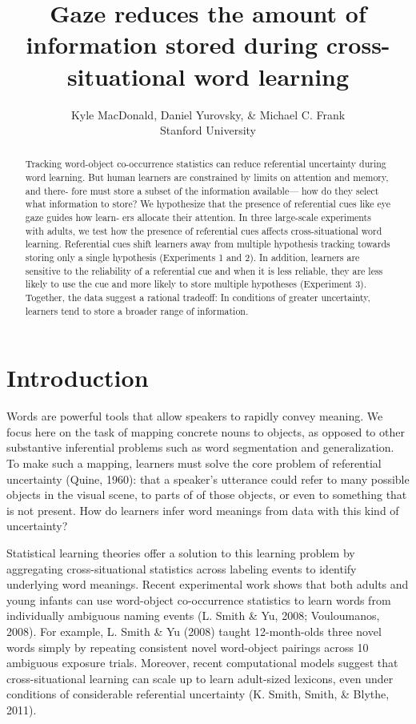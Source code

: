 \documentclass[12pt,]{article}
\title{Gaze reduces the amount of information stored during cross-situational
word learning}
\author{Kyle MacDonald, Daniel Yurovsky, \& Michael C. Frank\\Stanford
University}
\date{}
\begin{document}
\maketitle

\begin{abstract}
Tracking word-object co-occurrence statistics can reduce referential
uncertainty during word learning. But human learners are constrained by
limits on attention and memory, and there- fore must store a subset of
the information available--- how do they select what information to
store? We hypothesize that the presence of referential cues like eye
gaze guides how learn- ers allocate their attention. In three
large-scale experiments with adults, we test how the presence of
referential cues affects cross-situational word learning. Referential
cues shift learners away from multiple hypothesis tracking towards
storing only a single hypothesis (Experiments 1 and 2). In addition,
learners are sensitive to the reliability of a referential cue and when
it is less reliable, they are less likely to use the cue and more likely
to store multiple hypotheses (Experiment 3). Together, the data suggest
a rational tradeoff: In conditions of greater uncertainty, learners tend
to store a broader range of information.
\end{abstract}

\newpage

\section{Introduction}\label{introduction}

Words are powerful tools that allow speakers to rapidly convey meaning.
We focus here on the task of mapping concrete nouns to objects, as
opposed to other substantive inferential problems such as word
segmentation and generalization. To make such a mapping, learners must
solve the core problem of referential uncertainty (Quine, 1960): that a
speaker's utterance could refer to many possible objects in the visual
scene, to parts of of those objects, or even to something that is not
present. How do learners infer word meanings from data with this kind of
uncertainty?

Statistical learning theories offer a solution to this learning problem
by aggregating cross-situational statistics across labeling events to
identify underlying word meanings. Recent experimental work shows that
both adults and young infants can use word-object co-occurrence
statistics to learn words from individually ambiguous naming events (L.
Smith \& Yu, 2008; Vouloumanos, 2008). For example, L. Smith \& Yu
(2008) taught 12-month-olds three novel words simply by repeating
consistent novel word-object pairings across 10 ambiguous exposure
trials. Moreover, recent computational models suggest that
cross-situational learning can scale up to learn adult-sized lexicons,
even under conditions of considerable referential uncertainty (K. Smith,
Smith, \& Blythe, 2011).
\end{document}
